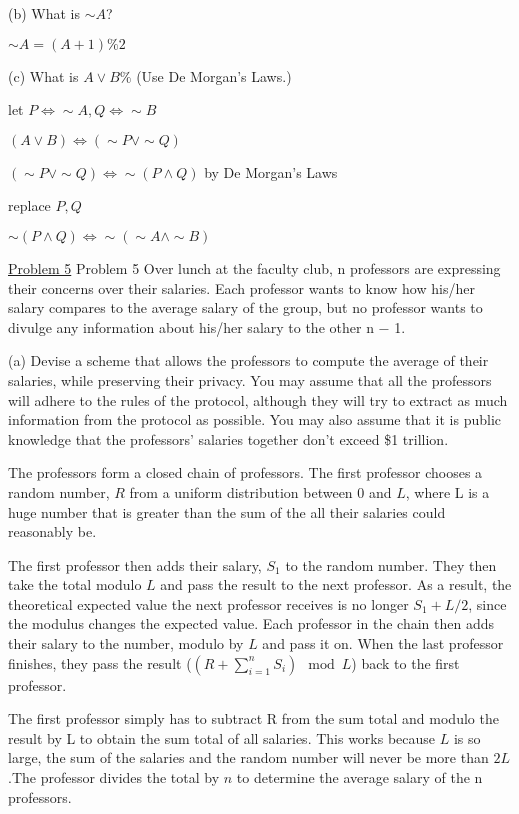\documentclass{article}
\begin{document}
(b) What is $\sim A$?\newline

$\sim A = (A + 1)\%2$\newline

(c) What is $A \lor B\%$ (Use De Morgan's Laws.)
\begin{center}
let $P \iff \sim A, Q \iff \sim B$

$(A \lor B) \iff (\sim P \lor \sim Q)$

$(\sim P \lor \sim Q) \iff  \sim (P \land Q)$ by De Morgan's Laws

replace $P, Q$

$\sim(P \land Q) \iff \sim(\sim A \land \sim B)$
\end{center}

\underline{Problem 5}
Problem 5
Over lunch at the faculty club, n professors are expressing their concerns over their salaries. Each
professor wants to know how his/her salary compares to the average salary of the group, but no
professor wants to divulge any information about his/her salary to the other n − 1.\newline

(a) Devise a scheme that allows the professors to compute the average of their salaries, while
preserving their privacy.\newline
You may assume that all the professors will adhere to the rules of the protocol, although they
will try to extract as much information from the protocol as possible. You may also assume
that it is public knowledge that the professors’ salaries together don’t exceed \$1 trillion.\newline

The professors form a closed chain of professors. The first professor chooses a random number, $R$ from a uniform distribution between 0 and $L$, where L is a huge number that is greater than the sum of the all their salaries could reasonably be. 

The first professor then adds their salary, $S_1$ to the random number. They then take the total modulo $L$ and pass the 
result to the next professor. As a result, the theoretical expected value the next professor receives is no longer 
$S_1+L/2$, since the modulus changes the expected value. Each professor in the chain then adds their salary to the number, modulo by $L$ and pass it on. When the last professor finishes, they pass the result ($(R+\sum_{i=1}^{n}S_i)\mod L$) back to the first professor. 

The first professor simply has to subtract R from the sum total and modulo the result by L to obtain the sum total of all salaries. This works because $L$ is so large, the sum of the salaries and the random number will never be more than $2L$.The professor divides the total by $n$ to determine the average salary of the n professors. \newline
\end{document}
